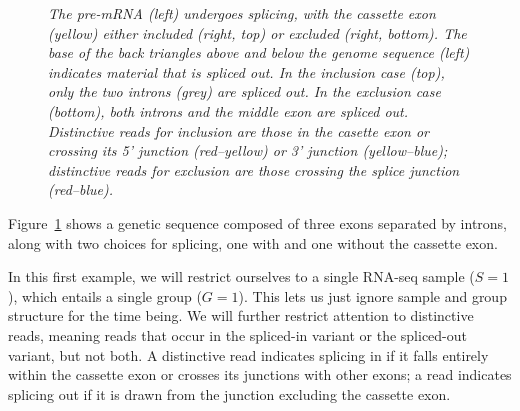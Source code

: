 \documentclass[11pt]{report}
\newcommand{\mycaption}[2]{\caption{\small\it #2}\label{#1}}
\begin{document}
\begin{figure}[t!]
  \centering
  \mycaption{fig:cassette-exon}{The pre-mRNA (left) undergoes
    splicing, with the cassette exon (yellow) either included (right,
    top) or excluded (right, bottom). The base of the back triangles
    above and below the genome sequence (left) indicates material that
    is spliced out. In the inclusion case (top), only the two introns
    (grey) are spliced out.  In the exclusion case (bottom), both
    introns and the middle exon are spliced out. Distinctive reads for
    inclusion are those in the casette exon or crossing its 5'
    junction (red--yellow) or 3' junction (yellow--blue); distinctive
    reads for exclusion are those crossing the splice junction (red--blue).}
\end{figure}

Figure~\ref{fig:cassette-exon} shows a genetic sequence composed of
three exons separated by introns, along with two choices for splicing,
one with and one without the cassette exon.

In this first example, we will restrict ourselves to a single RNA-seq
sample ($S = 1$), which entails a single group ($G = 1$). This lets us
just ignore sample and group structure for the time being. We will
further restrict attention to distinctive reads, meaning reads that
occur in the spliced-in variant or the spliced-out variant, but not
both. A distinctive read indicates splicing in if it falls entirely
within the cassette exon or crosses its junctions with other exons; a
read indicates splicing out if it is drawn from the junction excluding
the cassette exon.
\end{document}
